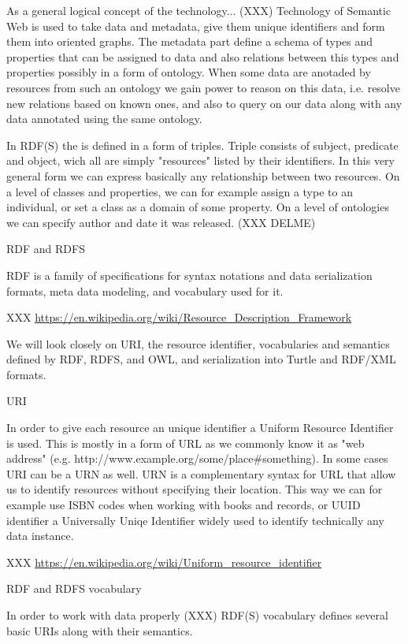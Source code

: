 As a general logical concept of the technology... (XXX) Technology of Semantic
Web is used to take data and metadata, give them unique identifiers and form
them into oriented graphs. The metadata part define a schema of types and
properties that can be assigned to data and also relations between this types
and properties possibly in a form of ontology. When some data are anotaded by
resources from such an ontology we gain power to reason on this data, i.e.
resolve new relations based on known ones, and also to query on our data along
with any data annotated using the same ontology. 

In RDF(S) the  is defined in a form of triples. Triple consists of subject,
predicate and object, wich all are simply "resources" listed by their
identifiers. In this very general form we can express basically any
relationship between two resources. On a level of classes and properties, we
can for example assign a type to an individual, or set a class as a domain of
some property. On a level of ontologies we can specify author and date it was
released. (XXX DELME) 

\sec RDF and RDFS

RDF is a family of specifications for syntax notations and data serialization
formats, meta data modeling, and vocabulary used for it. 

XXX \url{https://en.wikipedia.org/wiki/Resource_Description_Framework}

We will look closely on URI, the resource identifier, vocabularies and
semantics defined by RDF, RDFS, and OWL, and serialization into Turtle and
RDF/XML formats. 

\secc URI

In order to give each resource an unique identifier a Uniform Resource
Identifier is used. This is mostly in a form of URL as we commonly know it as
"web address" (e.g. http://www.example.org/some/place\#something). In some cases
URI can be a URN as well. URN is a complementary syntax for URL that allow us
to identify resources without specifying their location. This way we can for
example use ISBN codes when working with books and records, or UUID identifier
a Universally Uniqe Identifier widely used to identify technically any data
instance. 

XXX \url{https://en.wikipedia.org/wiki/Uniform_resource_identifier}

\secc RDF and RDFS vocabulary

In order to work with data properly (XXX) RDF(S) vocabulary defines several basic URIs along with their semantics. 

